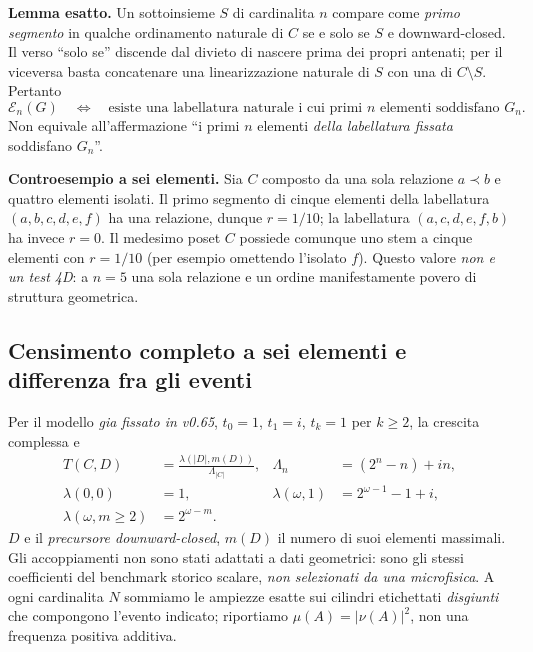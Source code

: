 \documentclass[11pt,a4paper]{article}
\begin{document}
\textbf{Lemma esatto.} Un sottoinsieme $S$ di cardinalita $n$ compare come \emph{primo segmento} in qualche ordinamento naturale di $C$ se e solo se $S$ e downward-closed. Il verso ``solo se'' discende dal divieto di nascere prima dei propri antenati; per il viceversa basta concatenare una linearizzazione naturale di $S$ con una di $C\setminus S$. Pertanto
\begin{equation}
 \mathcal E_n(G)\quad\Longleftrightarrow\quad
 \text{esiste una labellatura naturale i cui primi $n$ elementi soddisfano $G_n$}.
 \tag{CV.2}
\end{equation}
Non equivale all'affermazione ``i primi $n$ elementi \emph{della labellatura fissata} soddisfano $G_n$''.

\textbf{Controesempio a sei elementi.} Sia $C$ composto da una sola relazione $a\prec b$ e quattro elementi isolati. Il primo segmento di cinque elementi della labellatura $(a,b,c,d,e,f)$ ha una relazione, dunque $r=1/10$; la labellatura $(a,c,d,e,f,b)$ ha invece $r=0$. Il medesimo poset $C$ possiede comunque uno stem a cinque elementi con $r=1/10$ (per esempio omettendo l'isolato $f$). Questo valore \emph{non e un test 4D}: a $n=5$ una sola relazione e un ordine manifestamente povero di struttura geometrica.

\clearpage
\subsection*{Censimento completo a sei elementi e differenza fra gli eventi}
Per il modello \emph{gia fissato in v0.65}, $t_0=1$, $t_1=i$, $t_k=1$ per $k\ge2$, la crescita complessa e
\begin{equation}
 \begin{aligned}
 T(C,D)&=\frac{\lambda(|D|,m(D))}{\Lambda_{|C|}}, &
 \Lambda_n&=(2^n-n)+in,\\
 \lambda(0,0)&=1, & \lambda(\omega,1)&=2^{\omega-1}-1+i,\\
 \lambda(\omega,m\ge2)&=2^{\omega-m}. &
 \end{aligned}
 \tag{CV.3}
\end{equation}
$D$ e il \emph{precursore downward-closed}, $m(D)$ il numero di suoi elementi massimali. Gli accoppiamenti non sono stati adattati a dati geometrici: sono gli stessi coefficienti del benchmark storico scalare, \emph{non selezionati da una microfisica}. A ogni cardinalita $N$ sommiamo le ampiezze esatte sui cilindri etichettati \emph{disgiunti} che compongono l'evento indicato; riportiamo $\mu(A)=|\nu(A)|^2$, non una frequenza positiva additiva.
\end{document}
